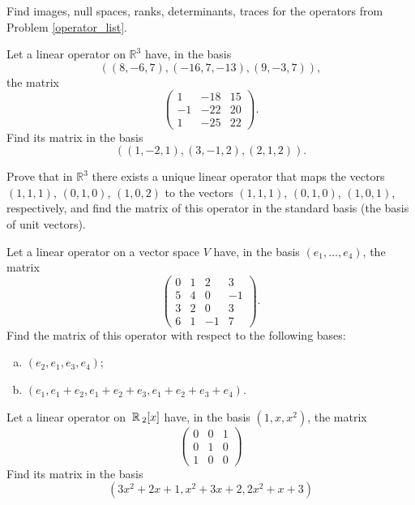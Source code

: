 \begin{problem}
Find images, null spaces, ranks, determinants, traces for the operators from Problem \ref{operator_list}.
\end{problem}

\begin{problem}
Let a linear operator on $\mathbb{R}^3$ have, in the basis
$$
((8,-6,7),(-16,7,-13),(9,-3,7)),
$$
the matrix
$$
\left(\begin{array}{rrr}
    1 & -18 & 15 \\
    -1 & -22 & 20 \\
    1 & -25 & 22
    \end{array}\right).
$$
Find its matrix in the basis
$$
((1,-2,1),(3,-1,2),(2,1,2)).
$$
\end{problem}

\begin{problem}
Prove that in $\mathbb{R}^3$ there exists a unique linear operator that maps the vectors $(1,1,1)$, $(0,1,0)$, $(1,0,2)$ to the vectors $(1,1,1)$, $(0,1,0)$, $(1,0,1)$, respectively, and find the matrix of this operator in the standard basis (the basis of unit vectors).
\end{problem}

\begin{problem}
Let a linear operator on a vector space $V$ have, in the basis $\left(e_1, \ldots, e_4\right)$, the matrix
$$
\left(\begin{array}{rrrr}
0 & 1 & 2 & 3 \\
5 & 4 & 0 & -1 \\
3 & 2 & 0 & 3 \\
6 & 1 & -1 & 7
\end{array}\right).
$$
Find the matrix of this operator with respect to the following bases:
\begin{enumerate}[a) ]
\item $\left(e_2, e_1, e_3, e_4\right)$;
\item $\left(e_1, e_1+e_2, e_1+e_2+e_3, e_1+e_2+e_3+e_4\right)$.
\end{enumerate}
\end{problem}

\begin{problem}
Let a linear operator on $\,\mathbb{R}\,_2[x]$ have, in the basis $(1, x, x^2)$, the matrix
$$
\left(\begin{array}{lll}
0 & 0 & 1 \\
0 & 1 & 0 \\
1 & 0 & 0
\end{array}\right)
$$
Find its matrix in the basis
$$
\left(3 x^2+2 x+1, x^2+3 x+2,2 x^2+x+3\right)
$$
\end{problem}


